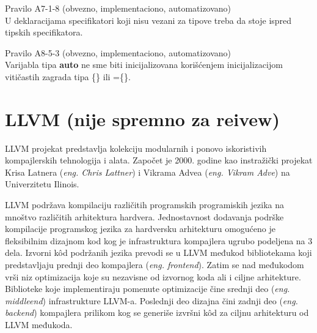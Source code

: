 \documentclass[12pt,oneside]{memoir}
\begin{document}
\begin{center}
\begin{tcolorbox}
Pravilo A7-1-8 (obvezno, implementaciono, automatizovano) \\
U deklaracijama specifikatori koji nisu vezani za tipove treba da stoje
ispred tipskih specifikatora.
\end{tcolorbox}
\end{center}

\begin{center}
\begin{tcolorbox}
Pravilo A8-5-3 (obvezno, implementaciono, automatizovano) \\
Varijabla tipa \textbf{auto} ne sme biti inicijalizovana kori\v{s}\'{c}enjem
inicijalizacijom viti\v{c}astih zagrada tipa \{\} ili =\{\}.
\end{tcolorbox}
\end{center}



\chapter{LLVM (nije spremno za reivew)}
\label{chp:llvm}

LLVM projekat predstavlja kolekciju modularnih i ponovo iskoristivih kompajlerskih tehnologija i alata.
Započet je 2000. godine kao instražički projekat Krisa Latnera (\textit{eng. Chris Lattner}) i Vikrama Advea (\textit{eng. Vikram Adve}) na Univerzitetu Ilinois.

LLVM podržava kompilaciju različitih programskih programiskih jezika na mnoštvo različitih arhitektura hardvera. Jednostavnost dodavanja podrške kompilacije programskog jezika za hardversku arhitekturu omogućeno je fleksibilnim dizajnom kod kog je infrastruktura kompajlera ugrubo podeljena na 3 dela. Izvorni k\^{o}d podržanih jezika prevodi se u LLVM međukod bibliotekama koji predstavljaju prednji deo kompajlera (\textit{eng. frontend}). Zatim se nad međukodom vrši niz optimizacija koje su nezavisne od izvornog koda ali i ciljne arhitekture. Biblioteke koje implementiraju pomenute optimizacije čine srednji deo (\textit{eng. middleend}) infrastrukture LLVM-a. Poslednji deo dizajna čini zadnji deo (\textit{eng. backend}) kompajlera prilikom kog se generiše izvršni k\^{o}d za ciljnu arhitekturu od LLVM međukoda.
\end{document}
